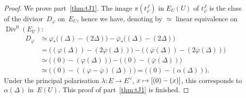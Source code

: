 \documentclass[11pt]{article}
\def\mto{\mathchoice{\longmapsto}{\mapsto}{\mapsto}{\mapsto}}
\let\oldvee\vee
\renewcommand{\vee}{{\scriptscriptstyle\oldvee}}
\theoremstyle{plain}
\theoremstyle{definition}
\numberwithin{equation}{subsection}
\let\ol\overline
\let\phi\varphi
\DeclareMathOperator{\Div}{Div}
\begin{document}
\begin{proof}
We prove part~\eqref{thm:tJ1}. The image $\pi(t^J_\phi)$ in $E_U(U)$ of
$t^J_\phi$ is the class of the divisor~$D_\phi$ on~$E_U$, hence we
have, denoting by $\simeq$ linear equivalence on $\Div^0(E_U)$:
\begin{align*}
D_\phi & \simeq \phi_*\big((\Delta)-(2\Delta)\big) - \ol{\phi}_*\big((\Delta)-(2\Delta)\big) \\
& = \big((\phi(\Delta))-(2\phi(\Delta))\big) - \big((\ol{\phi}(\Delta))-(2\ol{\phi}(\Delta))\big) \\
& \simeq \big( (0) - (\phi(\Delta))\big) - \big((0) - (\ol{\phi}(\Delta))\big) \\
& \simeq \big((0) - ((\phi-\ol{\phi})(\Delta))\big) = \big((0) - (\alpha(\Delta))\big).
\end{align*}
Under the principal polarisation $\lambda\colon E\to E^\vee$,
$x\mto [(0)-(x)]$, this corresponds to $\alpha(\Delta)$ in~$E(U)$.
This proof of part~\eqref{thm:tJ1} is finished.


\end{proof}
\end{document}
